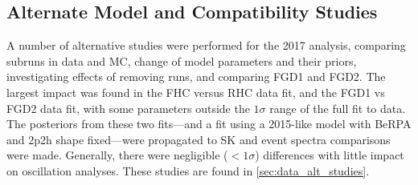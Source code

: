 


\subsection{Alternate Model and Compatibility Studies}
A number of alternative studies were performed for the 2017 analysis, comparing subruns in data and MC, change of model parameters and their priors, investigating effects of removing runs, and comparing FGD1 and FGD2. The largest impact was found in the FHC versus RHC data fit, and the FGD1 vs FGD2 data fit, with some parameters outside the $1\sigma$ range of the full fit to data. The posteriors from these two fits---and a fit using a 2015-like model with BeRPA and 2p2h shape fixed---were propagated to SK and event spectra comparisons were made. Generally, there were negligible ($<1\sigma$) differences with little impact on oscillation analyses. These studies are found in \autoref{sec:data_alt_studies}.

